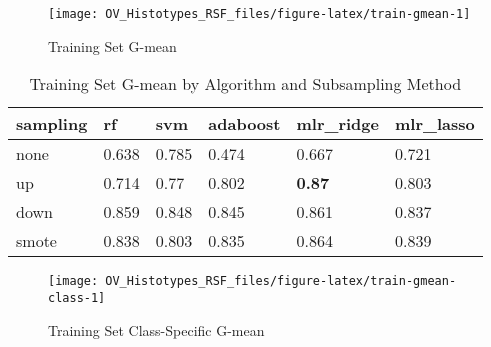 \documentclass[
]{report}
\begin{document}
\begin{figure}[H]

{\centering \texttt{[image: OV\_Histotypes\_RSF\_files/figure-latex/train-gmean-1]} 

}

\caption{Training Set G-mean}\label{fig:train-gmean}
\end{figure}

\begin{table}

\caption{\label{tab:train-gmean-table}Training Set G-mean by Algorithm and Subsampling Method}
\centering
\begin{tabular}[t]{l|l|l|l|l|l}
\hline
sampling & rf & svm & adaboost & mlr\_ridge & mlr\_lasso\\
\hline
none & 0.638 & 0.785 & 0.474 & 0.667 & 0.721\\
\hline
up & 0.714 & 0.77 & 0.802 & \textbf{0.87} & 0.803\\
\hline
down & 0.859 & 0.848 & 0.845 & 0.861 & 0.837\\
\hline
smote & 0.838 & 0.803 & 0.835 & 0.864 & 0.839\\
\hline
\end{tabular}
\end{table}

\begin{figure}[H]

{\centering \texttt{[image: OV\_Histotypes\_RSF\_files/figure-latex/train-gmean-class-1]} 

}

\caption{Training Set Class-Specific G-mean}\label{fig:train-gmean-class}
\end{figure}
\end{document}
